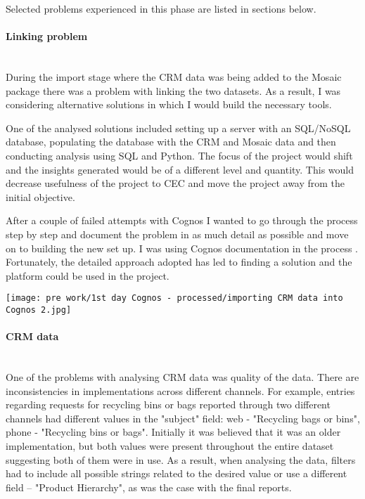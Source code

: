 Selected problems experienced in this phase are listed in sections below.			
			
				\paragraph{Linking problem}\mbox{}\\
During the import stage where the CRM data was being added to the Mosaic package there was a problem with linking the two datasets. As a result, I was considering alternative solutions in which I would build the necessary tools.

One of the analysed solutions included setting up a server with an SQL/NoSQL database, populating the database with the CRM and Mosaic data and then conducting analysis using SQL and Python. The focus of the project would shift and the insights generated would be of a different level and quantity. This would decrease usefulness of the project to CEC and move the project away from the initial objective.

After a couple of failed attempts with Cognos I wanted to go through the process step by step and document the problem in as much detail as possible and move on to building the new set up. I was using Cognos documentation in the process \citep{IBM2015, IBM2015c}. Fortunately, the detailed approach adopted has led to finding a solution and the platform could be used in the project.

\begin{center}
  \texttt{[image: pre work/1st day Cognos - processed/importing CRM data into Cognos 2.jpg]}
  \label{normal_case}
\end{center}
	
				\paragraph{CRM data}\mbox{}\\
One of the problems with analysing CRM data was quality of the data. There are inconsistencies in implementations across different channels. For example, entries regarding requests for recycling bins or bags reported through two different channels had different values in the "subject" field: web - "Recycling bags or bins", phone - "Recycling bins or bags". Initially it was believed that it was an older implementation, but both values were present throughout the entire dataset suggesting both of them were in use. As a result, when analysing the data, filters had to include all possible strings related to the desired value or use a different field – "Product Hierarchy", as was the case with the final reports.

